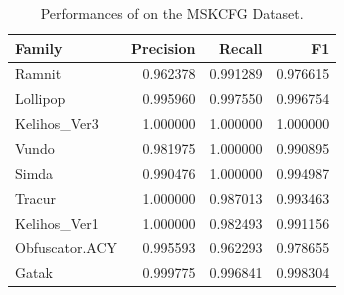 \begin{table}
\caption{Performances of \sysname on the MSKCFG Dataset.}
\begin{center}
\begin{tabular}{l|rrr}
\hline
   Family       &  Precision &    Recall &        F1 \\
\hline
\hline
   Ramnit       &   0.962378 &  0.991289 &  0.976615 \\
 Lollipop       &   0.995960 &  0.997550 &  0.996754 \\
 Kelihos\_Ver3  &   1.000000 &  1.000000 &  1.000000 \\
    Vundo       &   0.981975 &  1.000000 &  0.990895 \\
    Simda       &   0.990476 &  1.000000 &  0.994987 \\
   Tracur       &   1.000000 &  0.987013 &  0.993463 \\
 Kelihos\_Ver1  &   1.000000 &  0.982493 &  0.991156 \\
Obfuscator.ACY  &   0.995593 &  0.962293 &  0.978655 \\
    Gatak       &   0.999775 &  0.996841 &  0.998304 \\
\hline
\end{tabular}
\end{center}
\label{tab:MSKCFGScores}
\end{table}

